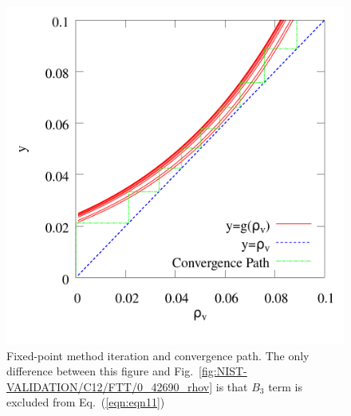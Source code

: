 \documentclass[5p,times]{elsarticle}
\begin{document}
\begin{figure} 
\includegraphics[scale=0.25]{Figures/NIST-VAL_FTF_C12_conv_0_42690.png}
\caption{Fixed-point method iteration and convergence path. The only difference between this figure and Fig.~\ref{fig:NIST-VALIDATION/C12/FTT/0_42690_rhov} is that $B_3$ term is excluded from Eq.~(\ref{eqn:eqn11})}
\label{fig:NIST-VALIDATION/C12/FTF/0_42690_rhov}
\end{figure}
\end{document}
